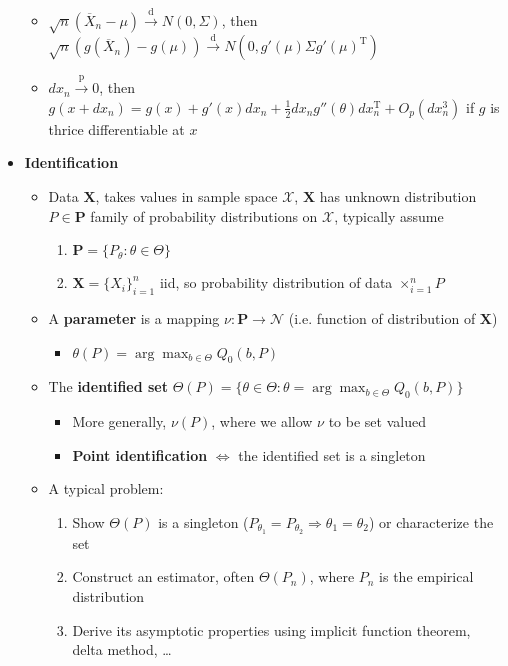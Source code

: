 \documentclass[12pt,english]{article}
\newcommand{\T}{\ensuremath{\text{T}}}
\begin{document}
\begin{itemize}
	\begin{itemize}
		\item $\sqrt{n} (\overline{X}_{n} - \mu) \overset{\text{d}}{\to} N(0, \Sigma)$, then $\sqrt{n} (g(\overline{X}_{n}) - g(\mu)) \overset{\text{d}}{\to} N(0, g'(\mu) \Sigma g'(\mu)^{\T})$ 
		\item $dx_{n} \overset{\text{p}}{\to} 0$, then $g(x + dx_{n}) = g(x) + g'(x) dx_{n} + \frac{1}{2} dx_{n} g''(\theta) dx_{n}^{\T} + O_{p}(dx_{n}^{3})$ if $g$ is thrice differentiable at $x$
	\end{itemize}
	\item \textbf{Identification}
	\begin{itemize}
		\item Data $\textbf{X}$, takes values in sample space $\mathcal{X}$, $\textbf{X}$ has unknown distribution $P \in \textbf{P}$ family of probability distributions on $\mathcal{X}$, typically assume
		\begin{enumerate}
			\item $\textbf{P} = \{ P_{\theta} : \theta \in \Theta \}$
			\item $\textbf{X} = \{ X_{i} \}_{i=1}^{n}$ iid, so probability distribution of data $\times_{i=1}^{n} P$
		\end{enumerate}
		\item A \textbf{parameter} is a mapping $\nu : \mathbf{P} \to \mathcal{N}$ (i.e. function of distribution of $\textbf{X}$)
		\begin{itemize}
			\item $\displaystyle\theta(P) = \arg \max_{b \in \Theta} Q_{0}(b, P)$
		\end{itemize}
		\item The \textbf{identified set} $\displaystyle\Theta(P) = \{ \theta \in \Theta : \theta = \arg \max_{b \in \Theta} Q_{0}(b, P) \}$
		\begin{itemize}
			\item More generally, $\nu(P)$, where we allow $\nu$ to be set valued
			\item \textbf{Point identification} $\Leftrightarrow$ the identified set is a singleton
		\end{itemize}
		\item A typical problem:
		\begin{enumerate}
			\item Show $\Theta(P)$ is a singleton ($P_{\theta_{1}} = P_{\theta_{2}} \Rightarrow \theta_{1} = \theta_{2}$) or characterize the set
			\item Construct an estimator, often $\Theta(P_{n})$, where $P_{n}$ is the empirical distribution
			\item Derive its asymptotic properties using implicit function theorem, delta method, \ldots
		\end{enumerate}
	\end{itemize}
\end{itemize}
\end{document}
